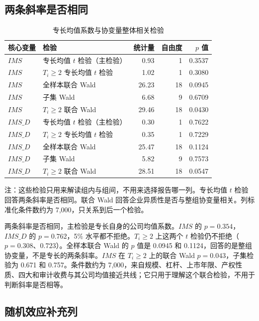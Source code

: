 \documentclass[12pt,a4paper]{article}
\begin{document}
\subsection{两条斜率是否相同}

\begin{table}[H]
\centering
\caption{专长均值系数与协变量整体相关检验}
\label{tab:wald}
\renewcommand{\arraystretch}{1.15}
\begin{tabular}{llrrr}
\toprule
核心变量 & 检验 & 统计量 & 自由度 & $p$ 值 \\
\midrule
$IMS$ & 专长均值 $t$ 检验（主检验） & 0.93 & 1 & 0.3537 \\
$IMS$ & $T_i\ge 2$ 专长均值 $t$ 检验 & 1.02 & 1 & 0.3080 \\
$IMS$ & 全样本联合 Wald & 26.23 & 18 & 0.0945 \\
$IMS$ & 子集 Wald & 6.68 & 9 & 0.6709 \\
$IMS$ & $T_i\ge 2$ 联合 Wald & 29.46 & 18 & 0.0430 \\
$IMS\_D$ & 专长均值 $t$ 检验（主检验） & 0.30 & 1 & 0.7622 \\
$IMS\_D$ & $T_i\ge 2$ 专长均值 $t$ 检验 & 0.35 & 1 & 0.7229 \\
$IMS\_D$ & 全样本联合 Wald & 25.47 & 18 & 0.1124 \\
$IMS\_D$ & 子集 Wald & 5.82 & 9 & 0.7573 \\
$IMS\_D$ & $T_i\ge 2$ 联合 Wald & 28.51 & 18 & 0.0547 \\
\bottomrule
\end{tabular}

\vspace{0.4em}
\parbox{0.92\textwidth}{\footnotesize 注：这些检验只用来解读组内与组间，不用来选择报告哪一列。专长均值 $t$ 检验回答两条斜率是否相同。联合 Wald 回答企业异质性是否与整组协变量相关。列标准化条件数约为 7{,}000，只关系到后一个检验。}
\end{table}

两条斜率是否相同，主检验是专长自身的公司均值系数。$IMS$ 的 $p=0.354$，$IMS\_D$ 的 $p=0.762$，5\% 水平都不拒绝。$T_i\ge 2$ 上这两个 $t$ 检验仍不拒绝（$p=0.308$、$0.723$）。全样本联合 Wald 的 $p$ 值是 0.0945 和 0.1124，回答的是整组协变量，不是专长的两条斜率。$IMS$ 在 $T_i\ge 2$ 上的联合 Wald $p=0.043$，子集检验为 0.671 和 0.757。条件数约为 7{,}000，来自规模、杠杆、上市年限、产权性质、四大和审计收费与其公司均值接近共线；它只用于理解这个联合检验，不用于判断斜率是否相等。

\subsection{随机效应补充列}
\end{document}
